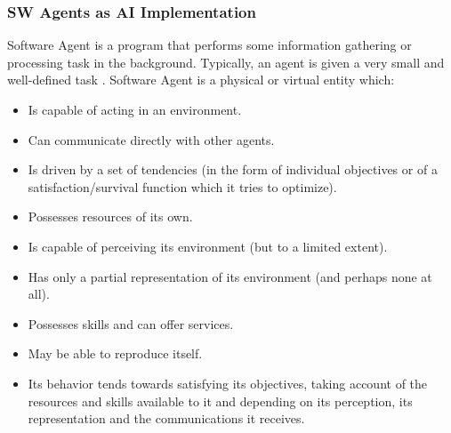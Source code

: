 \documentclass[12pt,a4paper,final,twoside,onecolumn,titlepage]{book}
\begin{document}
\subsubsection{SW Agents as AI Implementation}
Software Agent is a program that performs some information gathering or processing task in the background. Typically, an agent is given a very small and well-defined task \cite{MNAS02}. Software Agent is a physical or virtual entity which:
\begin{itemize}
\item Is capable of acting in an environment.
\item Can communicate directly with other agents. 
\item Is driven by a set of tendencies (in the form of individual objectives or of a satisfaction/survival function which it tries to optimize). 
\item Possesses resources of its own. 
\item Is capable of perceiving its environment (but to a limited extent). 
\item Has only a partial representation of its environment (and perhaps none at all). 
\item Possesses skills and can offer services. 
\item May be able to reproduce itself. 
\item Its behavior tends towards satisfying its objectives, taking account of the resources and skills available to it and depending on its perception, its representation and the communications it receives.
\end{itemize}
\end{document}
